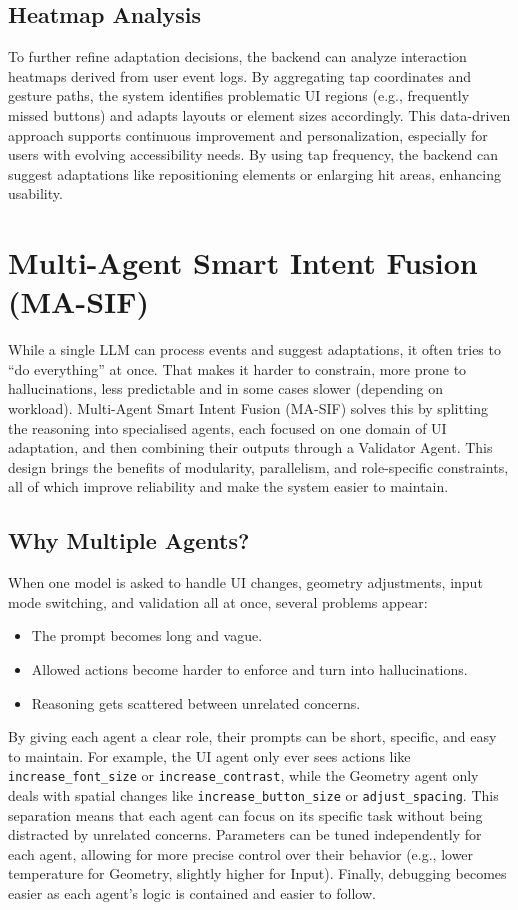 \documentclass[openany]{book}
\begin{document}
\subsection{Heatmap Analysis}

To further refine adaptation decisions, the backend can analyze interaction heatmaps derived from user event logs. By aggregating tap coordinates and gesture paths, the system identifies problematic UI regions (e.g., frequently missed buttons) and adapts layouts or element sizes accordingly. This data-driven approach supports continuous improvement and personalization, especially for users with evolving accessibility needs. By using tap frequency, the backend can suggest adaptations like repositioning elements or enlarging hit areas, enhancing usability.

\section{Multi-Agent Smart Intent Fusion (MA-SIF)}
While a single LLM can process events and suggest adaptations, it often tries to “do everything” at once.
That makes it harder to constrain, more prone to hallucinations, less predictable and in some cases slower (depending on workload).
Multi-Agent Smart Intent Fusion (MA-SIF) solves this by splitting the reasoning into specialised agents, each focused on one domain of UI adaptation, and then combining their outputs through a Validator Agent.
This design brings the benefits of modularity, parallelism, and role-specific constraints, all of which improve reliability and make the system easier to maintain.

\subsection{Why Multiple Agents?}
When one model is asked to handle UI changes, geometry adjustments, input mode switching, and validation all at once, several problems appear:
\begin{itemize}
    \item The prompt becomes long and vague.
    \item Allowed actions become harder to enforce and turn into hallucinations.
    \item Reasoning gets scattered between unrelated concerns.
\end{itemize}
By giving each agent a clear role, their prompts can be short, specific, and easy to maintain.
For example, the UI agent only ever sees actions like \texttt{increase\_font\_size} or \texttt{increase\_contrast}, while the Geometry agent only deals with spatial changes like \texttt{increase\_button\_size} or \texttt{adjust\_spacing}.
This separation means that each agent can focus on its specific task without being distracted by unrelated concerns. Parameters can be tuned independently for each agent, allowing for more precise control over their behavior (e.g., lower temperature for Geometry, slightly higher for Input). Finally, debugging becomes easier as each agent's logic is contained and easier to follow.
\end{document}
